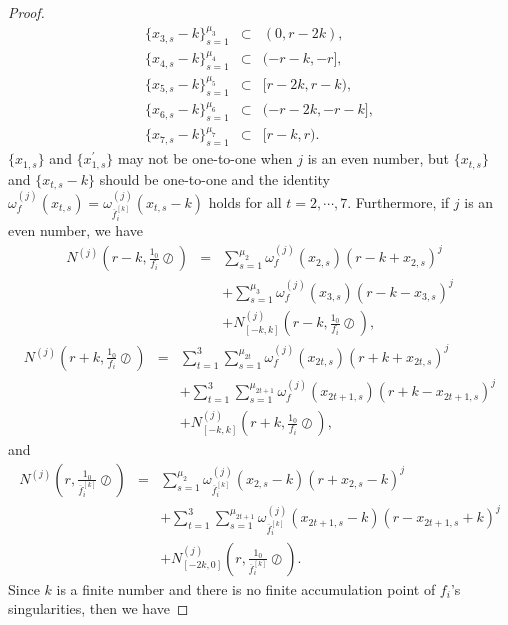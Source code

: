 \documentclass{article}
\begin{document}
\begin{proof}
\begin{eqnarray*}
        \{x_{3,s}-k\}_{s=1}^{\mu_{3}}&\subset& (0, r-2k),\\
        \{x_{4,s}-k\}_{s=1}^{\mu_{4}}&\subset& (-r-k, -r],\\
        \{x_{5,s}-k\}_{s=1}^{\mu_{5}}&\subset& [r-2k, r-k),\\
        \{x_{6,s}-k\}_{s=1}^{\mu_{6}}&\subset& (-r-2k, -r-k],\\
        \{x_{7,s}-k\}_{s=1}^{\mu_{7}}&\subset& [r-k, r).
    \end{eqnarray*}
    $\{x_{1,s}\}$ and $\{x_{1,s}^{'}\}$ may not be one-to-one when $j$ is an even number, but $\{x_{t,s}\}$ and $\{x_{t,s}-k\}$ should be one-to-one and the identity $\omega_{f}^{(j)}(x_{t,s})=\omega_{\overline{f}_{i}^{[k]}}^{(j)}(x_{t,s}-k)$ holds for all $t=2, \cdots, 7$. Furthermore, if $j$ is an even number, we have
    \begin{eqnarray}
        N^{(j)}\left(r-k, \frac{1_{0}}{f_{i}}\oslash\right)
        &=&\sum_{s=1}^{\mu_{2}}\omega_{f}^{(j)}(x_{2,s})(r-k+x_{2, s})^{j}\nonumber\\
        &&+\sum_{s=1}^{\mu_{3}}\omega_{f}^{(j)}(x_{3,s})(r-k-x_{3,s})^{j}\nonumber\\
        &&+N_{[-k, k]}^{(j)}\left(r-k, \frac{1_{0}}{f_{i}}\oslash\right),\label{6aaa1}
        \end{eqnarray}
        \begin{eqnarray}
        N^{(j)}\left(r+k, \frac{1_{0}}{f_{i}}\oslash\right)&=&\sum_{t=1}^{3}\sum_{s=1}^{\mu_{2t}}\omega_{f}^{(j)}(x_{2t,s})(r+k+x_{2t,s})^{j}\nonumber\\
        &&+\sum_{t=1}^{3}\sum_{s=1}^{\mu_{2t+1}}\omega_{f}^{(j)}(x_{2t+1,s})(r+k-x_{2t+1, s})^{j}\nonumber\\
        &&+N_{[-k, k]}^{(j)}\left(r+k, \frac{1_{0}}{f_{i}}\oslash\right)\label{6aaa2},
        \end{eqnarray}
    and
    \begin{eqnarray}
        N^{(j)}\left(r, \frac{1_{0}}{\overline{f}_{i}^{[k]}}\oslash\right)&=&\sum_{s=1}^{\mu_{2}}\omega_{\overline{f}_{i}^{[k]}}^{(j)}(x_{2,s}-k)(r+x_{2,s}-k)^{j}\nonumber\\
        &&+\sum_{t=1}^{3}\sum_{s=1}^{\mu_{2t+1}}\omega_{\overline{f}_{i}^{[k]}}^{(j)}(x_{2t+1,s}-k)(r-x_{2t+1, s}+k)^{j}\nonumber\\
        &&+N_{[-2k, 0]}^{(j)}\left(r, \frac{1_{0}}{\overline{f}_{i}^{[k]}}\oslash\right).\label{6aaa3}
    \end{eqnarray}
    Since $k$ is a finite number and there is no finite accumulation point of $f_{i}$'s singularities, then we have

\end{proof}
\end{document}
